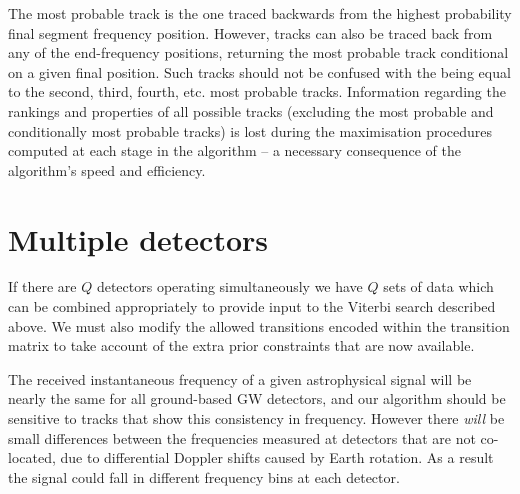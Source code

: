 %
%
The most probable track is the one traced backwards from the highest probability final segment frequency position. However, tracks can also be traced back from any of the end-frequency positions, returning the most probable track conditional on a given final position. Such tracks should not be confused with the being equal to the second, third, fourth, etc. most probable tracks. Information regarding the rankings and properties of all possible tracks (excluding the most probable and conditionally most probable tracks) is lost during the maximisation procedures computed at each stage in the algorithm --  a necessary consequence of the algorithm's speed and efficiency.

\section{\label{soap:multidet}Multiple detectors}
%
%
If there are $Q$ detectors operating simultaneously we have $Q$ sets of data which can be combined appropriately to provide input to the Viterbi search described above. We must also modify the allowed transitions encoded within the transition matrix to take account of the extra prior constraints that are now available.

%
%
The received instantaneous frequency of a given astrophysical signal will be nearly the same for all ground-based \gls{GW} detectors, and our
algorithm should be sensitive to tracks that show this consistency in
frequency. However there \emph{will} be small differences between the frequencies measured at detectors that are not co-located, due to differential Doppler shifts caused by Earth rotation. As a result the signal could fall in different frequency bins at each detector.

